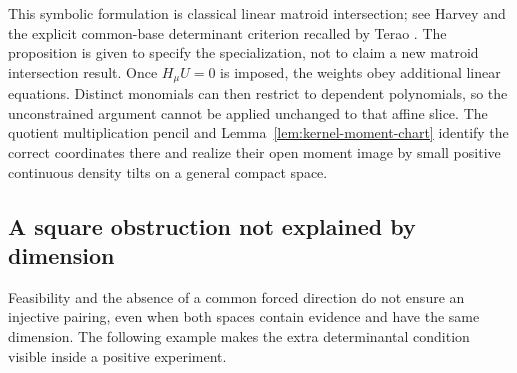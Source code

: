 \documentclass[11pt]{amsart}
\theoremstyle{definition}\newtheorem{definition}[theorem]{Definition}
\theoremstyle{remark}\newtheorem{remark}[theorem]{Remark}
\begin{document}
This symbolic formulation is classical linear matroid intersection; see
Harvey \cite{Harvey2009} and the explicit common-base determinant
criterion recalled by Terao \cite[p.~39:2]{Terao2026}. The proposition
is given to specify the specialization, not to claim a new matroid
intersection result. Once $H_\mu U=0$ is imposed, the weights obey
additional linear equations. Distinct monomials can then restrict to
dependent polynomials, so the unconstrained argument cannot be applied
unchanged to that affine slice. The quotient multiplication pencil and
Lemma~\ref{lem:kernel-moment-chart} identify the correct coordinates
there and realize their open moment image by small positive continuous
density tilts on a general compact space.

\subsection{A square obstruction not explained by dimension}
Feasibility and the absence of a common forced direction do not ensure
an injective pairing, even when both spaces contain evidence and have
the same dimension. The following example makes the extra determinantal
condition visible inside a positive experiment.
\end{document}
